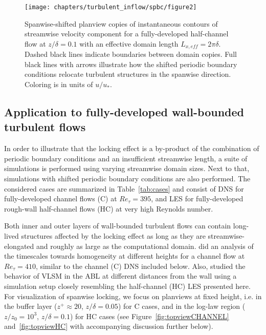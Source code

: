 	\begin{figure}
		\centering
		\texttt{[image: chapters/turbulent\_inflow/spbc/figure2]}
		\caption{Spanwise-shifted planview copies of instantaneous contours of streamwise velocity component for a fully-developed half-channel flow at $z/\delta = 0.1$ with an effective domain length $L_{x,eff} = 2\pi\delta$. Dashed black lines indicate boundaries between domain copies. Full black lines with arrows illustrate how the shifted periodic boundary conditions relocate turbulent structures in the spanwise direction. Coloring is in units of $u/u_*$. }
		\label{fig:topview_shift}
	\end{figure}
	
	
	\subsection{Application to fully-developed wall-bounded turbulent flows}\label{sec:inflow_shifted_application}
		In order to illustrate that the locking effect is a by-product of the combination of periodic boundary conditions and an insufficient streamwise length, a suite of simulations is performed using varying streamwise domain sizes. Next to that, simulations with shifted periodic boundary conditions are also performed. The considered cases are summarized in Table~\ref{tab:cases} and consist of DNS for fully-developed channel flows (C) at $Re_\tau = 395$, and LES for fully-developed rough-wall half-channel flows (HC) at very high Reynolds number. 
		
		Both inner and outer layers of wall-bounded turbulent flows can contain long-lived structures affected by the locking effect as long as they are streamwise-elongated and roughly as large as the computational domain. \cite{fishpool2009persistent} did an analysis of the timescales towards homogeneity at different heights for a channel flow at $Re_\tau = 410$, similar to the channel (C) DNS included below. Also, \cite{fang2015large} studied the behavior of VLSM in the ABL at different distances from the wall using a simulation setup closely resembling the half-channel (HC) LES presented here. For visualization of spanwise locking, we focus on planviews at fixed height, i.e. in the buffer layer ($z^+ \approx 20 $, $z/\delta = 0.05$) for C cases, and in the log-law region ($z/z_0 = 10^3$, $z/\delta = 0.1$) for HC cases (see Figure~\ref{fig:topviewCHANNEL} and~\ref{fig:topviewHC} with accompanying discussion further below).
		
